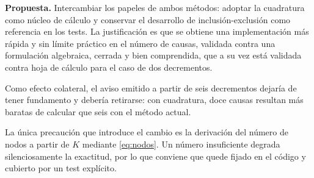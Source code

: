\documentclass[a4paper, 12pt]{article}
\begin{document}
\textbf{Propuesta.} Intercambiar los papeles de ambos métodos: adoptar la cuadratura como núcleo de cálculo y conservar el desarrollo de inclusión-exclusión como referencia en los tests. La justificación es que se obtiene una implementación más rápida y sin límite práctico en el número de causas, validada contra una formulación algebraica, cerrada y bien comprendida, que a su vez está validada contra hoja de cálculo para el caso de dos decrementos.

Como efecto colateral, el aviso emitido a partir de seis decrementos dejaría de tener fundamento y debería retirarse: con cuadratura, doce causas resultan más baratas de calcular que seis con el método actual.

La única precaución que introduce el cambio es la derivación del número de nodos a partir de $K$ mediante \eqref{eq:nodos}. Un número insuficiente degrada silenciosamente la exactitud, por lo que conviene que quede fijado en el código y cubierto por un test explícito.
\end{document}
